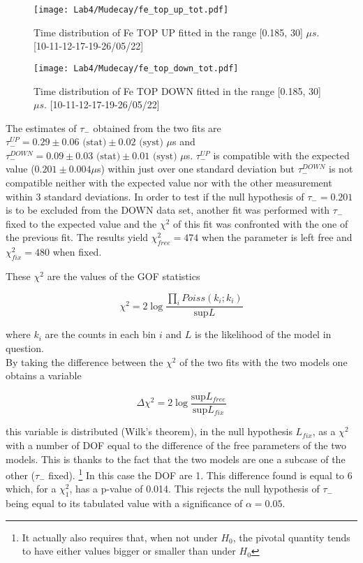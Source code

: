 \documentclass[10pt,a4paper,twocolumn]{article}
\begin{document}
\begin{figure}[h!]
\centering
\caption{Time distribution of Fe TOP UP fitted in the range [0.185, 30] $\mu s$. [10-11-12-17-19-26/05/22]}
\texttt{[image: Lab4/Mudecay/fe\_top\_up\_tot.pdf]} 
\label{FEUP-}
\end{figure}

\begin{figure}[h!]
\centering
\caption{Time distribution of Fe TOP DOWN fitted in the range [0.185, 30] $\mu s$. [10-11-12-17-19-26/05/22]}
\texttt{[image: Lab4/Mudecay/fe\_top\_down\_tot.pdf]} 
\label{FEDW-}
\end{figure}

The estimates of $\tau_-$ obtained from the two fits are
$\tau_-^{UP}=0.29 \pm 0.06 \text{ (stat)} \pm 0.02 \text{ (syst) }\mu$s and $\tau_-^{DOWN}=0.09 \pm 0.03 \text{ (stat)} \pm 0.01 \text{ (syst) }\mu$s. $\tau_-^{UP}$ is compatible with the expected value ($0.201 \pm 0.004 \mu$s) within just over one standard deviation but $\tau_-^{DOWN}$ is not compatible neither with the expected value nor with the other measurement within 3 standard deviations. In order to test if the null hypothesis of $\tau_- = 0.201$ is to be excluded from the DOWN data set, another fit was performed with $\tau_-$ fixed to the expected value and the $\chi^2$ of this fit was confronted with the one of the previous fit. The results yield $\chi^2_{free} = 474$ when the parameter is left free and $\chi^2_{fix} = 480$ when fixed. 

These $\chi^2$ are the values of the GOF statistics 

\begin{equation}
   \chi^2=2\log\frac{\prod_i Poiss(k_i;k_i)}{\text{sup}L} 
\end{equation}


where $k_i$ are the counts in each bin $i$ and $L$ is the likelihood of the model in question. 
\\
By taking the difference between the $\chi^2$ of the two fits with the two models one obtains a variable 

\begin{equation}
    \Delta \chi^2=2\log \frac{\text{sup}L_{free}}{\text{sup}L_{fix}}
\end{equation}

this variable is distributed (Wilk's theorem), in the null hypothesis $L_{fix}$, as a $\chi^2$ with a number of DOF equal to the difference of the free parameters of the two models. This is thanks to the fact that the two models are one a subcase of the other ($\tau_-$ fixed). \footnote{It actually also requires that, when not under $H_0$, the pivotal quantity tends to have either values bigger or smaller than under $H_0$} In this case the DOF are 1.
This difference found is equal to 6 which, for a $\chi^2_1$, has a p-value of 0.014. This rejects the null hypothesis of $\tau_-$ being equal to its tabulated value with a significance of $\alpha=0.05$. 
\end{document}
